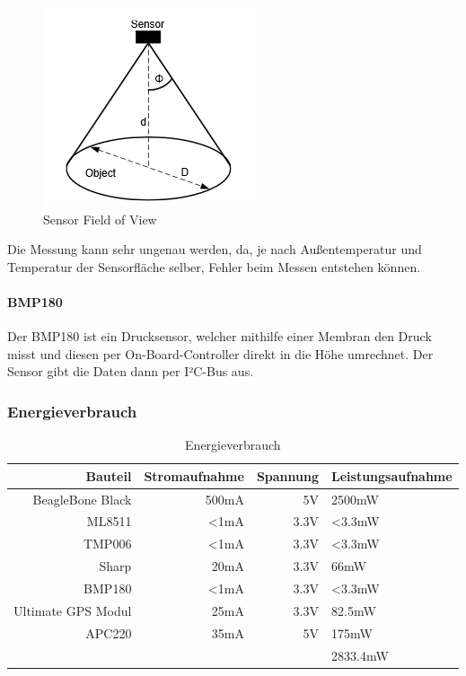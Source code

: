 \begin{figure}[h]
	\centering
	\includegraphics[scale=0.5]{2_Beschreibung_des_CANSAT/sensor_fov.png}
	\caption{Sensor Field of View}
	\label{sensor fov}
\end{figure}

Die Messung kann sehr ungenau werden, da, je nach Außentemperatur und Temperatur der Sensorfläche selber, Fehler beim Messen entstehen können.

\paragraph{BMP180}
Der BMP180 ist ein Drucksensor, welcher mithilfe einer Membran den Druck misst und diesen per On-Board-Controller direkt in die Höhe umrechnet. Der Sensor gibt die Daten dann per I²C-Bus aus.

\subsubsection{Energieverbrauch}
\begin{table}[H]
  \centering
    \begin{tabular}{rrrl}
    \toprule
    \textbf{Bauteil} & \textbf{Stromaufnahme} & \textbf{Spannung} & \textbf{Leistungsaufnahme} \\
    \midrule
    BeagleBone Black  & 500mA & 5V & 2500mW \\
    ML8511& <1mA & 3.3V & <3.3mW \\
    TMP006& <1mA& 3.3V& <3.3mW \\
    Sharp& 20mA & 3.3V& 66mW\\
    BMP180& <1mA& 3.3V& <3.3mW \\
    Ultimate GPS Modul& 25mA&3.3V& 82.5mW \\
    APC220& 35mA & 5V & 175mW\\

    \bottomrule
     & & &2833.4mW \\
    \bottomrule
    \end{tabular}%
    \caption{Energieverbrauch}
  \label{tab:budgetausgaben}%
\end{table}%
